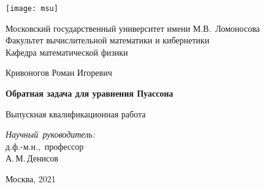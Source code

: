 \begin{titlepage}
	
	\begin{center}
		\texttt{[image: msu]}
		
		Московский государственный университет имени М.В.~Ломоносова\\
		Факультет вычислительной математики и кибернетики\\
		Кафедра математической физики
		
		\vspace{1.5cm}
		
		\Large{Кривоногов Роман Игоревич}
		
		\vspace{1cm}
		
		\textbf{\Large{Обратная задача для уравнения Пуассона}}
		
		\vspace{0.5cm}
		
		\Large{Выпускная квалификационная работа}
	\end{center}
	
	\vspace{1.7cm}
	
	\begin{flushright}
		\large{
			\emph{Научный~руководитель:}\\
			д.ф.-м.н.,~профессор\\
			А.\,М.\,Денисов
		}
	\end{flushright}
	
	\vfill
	
	\begin{center}
		Москва, 2021
	\end{center}
	
\end{titlepage}

\pagebreak
